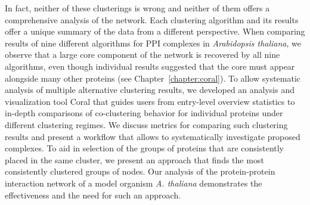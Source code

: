 In fact, neither of these clusterings is wrong and neither of them offers a comprehensive analysis of the network. Each clustering algorithm and its results offer a unique summary of the data from a different perspective. When comparing results of nine different algorithms for PPI complexes in \textit{Arabidopsis thaliana}, we observe that a large core component of the network is recovered by all nine algorithms, even though individual results suggested that the core must appear alongside many other proteins (see Chapter~\ref{chapter:coral}). To allow systematic analysis of multiple alternative clustering results, we developed an analysis and visualization tool Coral that guides users from entry-level overview statistics to in-depth comparisons of co-clustering behavior for individual proteins under different clustering regimes. We discuss metrics for comparing such clustering results and present a workflow that allows to systematically investigate proposed complexes. To aid in selection of the groups of proteins that are consistently placed in the same cluster, we present an approach that finds the most consistently clustered groups of nodes. Our analysis of the protein-protein interaction network of a model organism \textit{A. thaliana} demonstrates the effectiveness and the need for such an approach.



